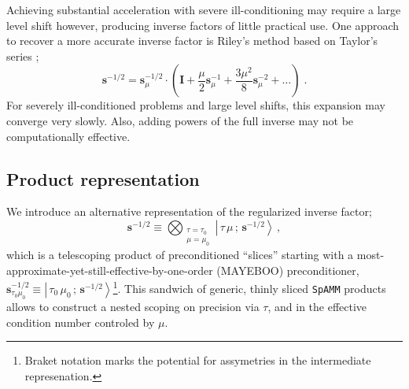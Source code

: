 \documentclass[letterpaper,twocolumn,amsmath,amsfont,amssymb,english,aps,jcp,preprintnumbers,groupaddress,nofootinbib,tightenlines,floatfix]{revtex4}
\newcommand{\mat}[1]{\boldsymbol{#1}}
\theoremstyle{plain}
\theoremstyle{remark}
\theoremstyle{plain}
\begin{document}
Achieving substantial acceleration with severe ill-conditioning  may require a large level shift however, 
producing inverse factors of little practical use.  One approach to recover a more accurate inverse
factor is Riley's method based on Taylor's series \cite{}; 
\begin{equation}
\mat{s}^{-1/2} = \mat{s}^{-1/2}_{\mu} \cdot \left( \mat{I}+\frac{\mu}{2} \mat{s}^{-1}_{\mu}
                                                   +\frac{3 \mu^2}{8} \mat{s}^{-2}_{\mu} + \dots
   \right) \; .
\end{equation}
For severely ill-conditioned problems and large level shifts, this expansion may converge very slowly. 
Also, adding powers of the full inverse may not be computationally effective. 

\subsection{Product representation}

We introduce an alternative representation of the regularized inverse factor;
\begin{equation} \label{spammsandwich}
\mat{s}^{-1/2} \equiv \bigotimes_{\substack{\tau=\tau_0 \\ \mu=\mu_0   } } {\left|\, \tau\, \mu \, ; \, \scriptstyle{\mat{s}^{-1/2}}  \right>}  \, ,
\end{equation}
which is a telescoping product of preconditioned ``slices'' 
starting with a most-approximate-yet-still-effective-by-one-order (MAYEBOO) preconditioner, 
$\mat{s}^{-1/2}_{\tau_0 \mu_0} \equiv {\left|\, \tau_0\, \mu_0 \, ; \, \scriptstyle{\mat{s}^{-1/2}}\right>}$\footnote{Braket notation marks 
the potential for assymetries in the intermediate represenation.}.  
This sandwich of generic, thinly sliced {\tt SpAMM} products allows to construct a nested scoping on precision via $\tau$, and in the 
effective condition number controled by $\mu$.


\end{document}
